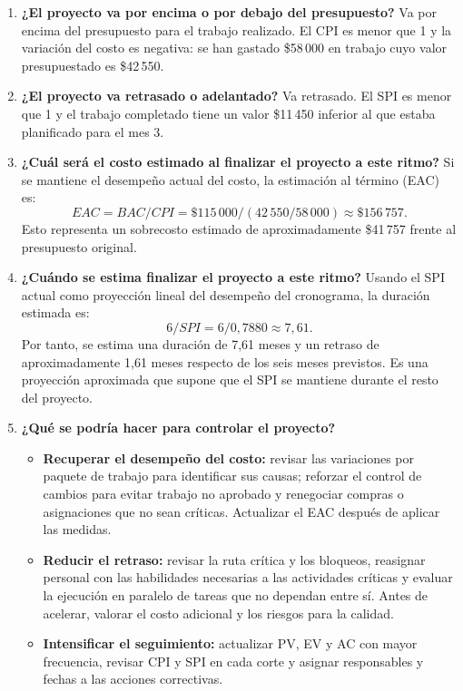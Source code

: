 \documentclass[12pt,letterpaper]{article}
\begin{document}
\begin{enumerate}
  \item \textbf{¿El proyecto va por encima o por debajo del presupuesto?}
  Va por encima del presupuesto para el trabajo realizado. El CPI es menor que
  1 y la variación del costo es negativa: se han gastado \$58\,000 en trabajo
  cuyo valor presupuestado es \$42\,550.

  \item \textbf{¿El proyecto va retrasado o adelantado?}
  Va retrasado. El SPI es menor que 1 y el trabajo completado tiene un valor
  \$11\,450 inferior al que estaba planificado para el mes 3.

  \item \textbf{¿Cuál será el costo estimado al finalizar el proyecto a este
  ritmo?}
  Si se mantiene el desempeño actual del costo, la estimación al término (EAC)
  es:
  \[
  EAC = BAC/CPI = \$115\,000/(42\,550/58\,000) \approx \$156\,757.
  \]
  Esto representa un sobrecosto estimado de aproximadamente \$41\,757 frente
  al presupuesto original.

  \item \textbf{¿Cuándo se estima finalizar el proyecto a este ritmo?}
  Usando el SPI actual como proyección lineal del desempeño del cronograma, la
  duración estimada es:
  \[
  6/SPI = 6/0{,}7880 \approx 7{,}61.
  \]
  Por tanto, se estima una duración de 7,61 meses y un retraso de
  aproximadamente 1,61 meses respecto de
  los seis meses previstos. Es una proyección aproximada que supone que el SPI
  se mantiene durante el resto del proyecto.

  \item \textbf{¿Qué se podría hacer para controlar el proyecto?}
  \begin{itemize}
    \item \textbf{Recuperar el desempeño del costo:} revisar las variaciones
    por paquete de trabajo para identificar sus causas; reforzar el control de
    cambios para evitar trabajo no aprobado y renegociar compras o asignaciones
    que no sean críticas. Actualizar el EAC después de aplicar las medidas.
    \item \textbf{Reducir el retraso:} revisar la ruta crítica y los bloqueos,
    reasignar personal con las habilidades necesarias a las actividades
    críticas y evaluar la ejecución en paralelo de tareas que no dependan
    entre sí. Antes de acelerar, valorar el costo adicional y los riesgos para
    la calidad.
    \item \textbf{Intensificar el seguimiento:} actualizar PV, EV y AC con
    mayor frecuencia, revisar CPI y SPI en cada corte y asignar responsables y
    fechas a las acciones correctivas.
  \end{itemize}
\end{enumerate}
\end{document}
